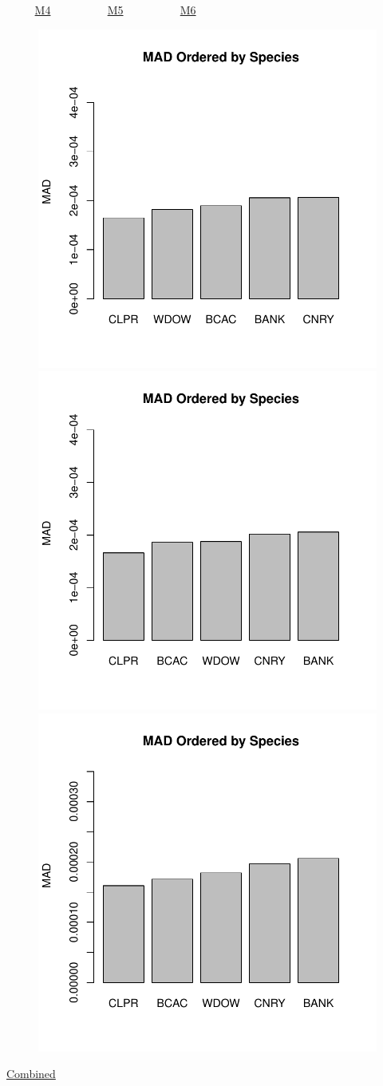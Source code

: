\documentclass[ xcolor = pdftex, dvipsnames, table ]{beamer}
\begin{document}
%
%

\begin{frame}{$~~~~~~~~~~$ \href{https://github.com/gasduster99/sppComp/tree/master/sscRuns/25319781982M4}{M4} $~~~~~~~~~~~~~~~~~~~~$ \href{https://github.com/gasduster99/sppComp/tree/master/sscRuns/25319781982M5}{M5} $~~~~~~~~~~~~~~~~~~~~$ \href{https://github.com/gasduster99/sppComp/tree/master/sscRuns/25319781982M6}{M6} }	
	\begin{figure}[ht!]
        \centering
	\hspace*{-1cm}
        \includegraphics[width=.4\textwidth]{../sscRuns/25319781982M4/sppHeadMad68.pdf}
        \includegraphics[width=.4\textwidth]{../sscRuns/25319781982M5/sppHeadMad68.pdf}
	\includegraphics[width=.4\textwidth]{../sscRuns/25319781982M6/sppHeadMad68.pdf}
	\end{figure}
	\vspace{-1cm}
	\begin{center}
	\Large
	\href{https://github.com/gasduster99/sppComp/tree/master/try1/postSSC/25319781982M4M5M6}{Combined}
	\end{center}
\end{frame}
\end{document}
